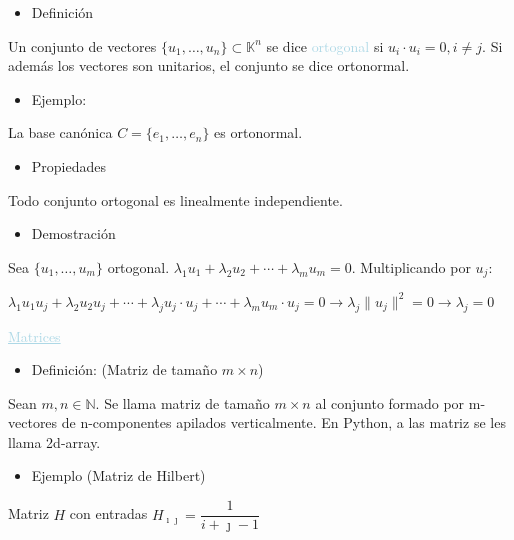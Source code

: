 \documentclass[12pt]{article}
\begin{document}
\begin{itemize}[label=\color{red}\textbullet, leftmargin=*]
    \item \color{lightblue} Definición
\end{itemize}
Un conjunto de vectores $\{u_1,\hdots,u_n\}\subset\mathbb{K}^n$
se dice \textcolor{lightblue}{ortogonal} si $u_i\cdot
u_i=0,i\neq j$. Si además los vectores son unitarios, el
conjunto se dice ortonormal.
\begin{itemize}[label=\color{red}\textbullet, leftmargin=*]
    \item \color{lightblue} Ejemplo:
\end{itemize}
La base canónica $C=\{e_1,\hdots,e_n\}$ es ortonormal.
\begin{itemize}[label=\color{red}\textbullet, leftmargin=*]
    \item \color{lightblue} Propiedades
\end{itemize}
Todo conjunto ortogonal es linealmente independiente.
\begin{itemize}[label=\color{red}\textbullet, leftmargin=*]
    \item \color{lightblue} Demostración
\end{itemize}
Sea $\{u_1,\hdots,u_m\}$ ortogonal.
$\lambda_1u_1+\lambda_2u_2+\cdots+\lambda_mu_m=0$. Multiplicando
por $u_j$:

$\lambda_1u_1u_j+\lambda_2u_2u_j+\cdots+\lambda_ju_j\cdot
u_j+\cdots+\lambda_mu_m\cdot
u_j=0\longrightarrow\lambda_j\|u_j\|^2=0\longrightarrow
\lambda_j=0$

\textcolor{lightblue}{\underline{Matrices}}

\begin{itemize}[label=\color{red}\textbullet, leftmargin=*]
\item \color{lightblue} Definición: (Matriz de tamaño $m\times
n$)
\end{itemize}
Sean $m,n\in\mathbb{N}$. Se llama matriz de tamaño $m\times n$
al conjunto formado por m-vectores de n-componentes apilados
verticalmente. En Python, a las matriz se les llama 2d-array.
\begin{itemize}[label=\color{red}\textbullet, leftmargin=*]
    \item \color{lightblue} Ejemplo (Matriz de Hilbert)
\end{itemize}
Matriz $H$ con entradas $H_{\imath\jmath  }=\dfrac{1}{i+\jmath -1}$
\end{document}
